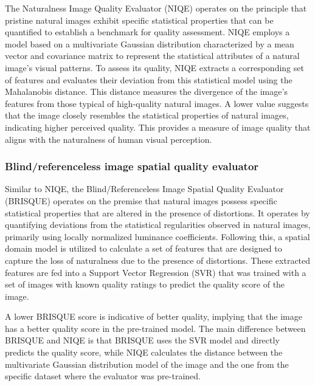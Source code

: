        
            The Naturalness Image Quality Evaluator (NIQE) \cite{niqe} operates on the principle that pristine natural images exhibit specific statistical properties that can be quantified to establish a benchmark for quality assessment. 
            NIQE employs a model based on a multivariate Gaussian distribution characterized by a mean vector and covariance matrix to represent the statistical attributes of a natural image's visual patterns.
            To assess its quality, NIQE extracts a corresponding set of features and evaluates their deviation from this statistical model using the Mahalanobis distance.
            This distance measures the divergence of the image's features from those typical of high-quality natural images.
            A lower value suggests that the image closely resembles the statistical properties of natural images, indicating higher perceived quality. This provides a measure of image quality that aligns with the naturalness of human visual perception. 

        \subsubsection{Blind/referenceless image spatial quality evaluator}

            Similar to NIQE, the Blind/Referenceless Image Spatial Quality Evaluator (BRISQUE) \cite{mittal2012} operates on the premise that natural images possess specific statistical properties that are altered in the presence of distortions. It operates by quantifying deviations from the statistical regularities observed in natural images, primarily using locally normalized luminance coefficients. 
            Following this, a spatial domain model is utilized to calculate a set of features that are designed to capture the loss of naturalness due to the presence of distortions.
            These extracted features are fed into a Support Vector Regression (SVR) that was trained with a set of images with known quality ratings to predict the quality score of the image.
            
            A lower BRISQUE score is indicative of better quality, implying that the image has a better quality score in the pre-trained model. The main difference between BRISQUE and NIQE is that BRISQUE uses the SVR model and directly predicts the quality score, while NIQE calculates the distance between the multivariate Gaussian distribution model of the image and the one from the specific dataset where the evaluator was pre-trained.




